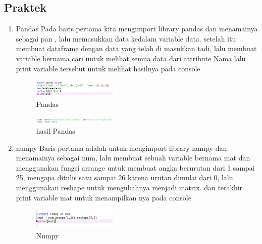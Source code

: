     \subsection{Praktek}
        \begin{enumerate}
            \item Pandas
            Pada baris pertama kita mengimport library pandas dan menamainya sebagai pan , lalu memasukkan data kedalam variable data. setelah itu membuat dataframe dengan data yang telah di masukkan tadi, lalu membuat variable bernama cari untuk melihat semua data dari attribute Nama lalu print variable tersebut untuk melihat hasilnya pada console
            
            \begin{figure}[H]
            \includegraphics[width=4cm]{figures/1174040/chapter3/1.png}
            \centering
            \caption{Pandas}
            \end{figure}
            \begin{figure}[H]
                \includegraphics[width=4cm]{figures/1174040/chapter3/2.png}
                \centering
                \caption{hasil Pandas}
                \end{figure}
            \item numpy
            Baris pertama adalah untuk mengimport library numpy dan menamainya sebagai num, lalu membuat sebuah variable bernama mat dan menggunakan fungsi arrange untuk membuat angka berurutan dari 1 sampai 25, mengapa ditulis satu sampai 26 karena urutan dimulai dari 0,  lalu menggunakan reshape untuk mengubahnya menjadi matrix. dan terakhir print variable mat untuk menampilkan nya pada console
            \begin{figure}[H]
                \includegraphics[width=4cm]{figures/1174040/chapter3/3.png}
                \centering
                \caption{Numpy}
                \end{figure}


\end{enumerate}
